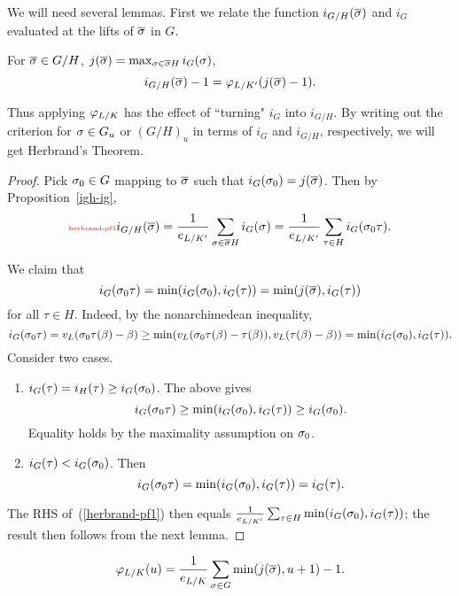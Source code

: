 We will need several lemmas. First we relate the function $i_{G/H}(\overline{\sigma})$ and $i_G$ evaluated at the lifts of $\overline{\sigma}$ in $G$. 
\begin{lem}
For $\overline{\sigma}\in G/H$, $j(\overline{\sigma})=\max_{\sigma \in \overline{\sigma}H} i_G(\sigma)$,
\[
i_{G/H}(\overline{\sigma})-1=\varphi_{L/K'} (j(\overline{\sigma})-1).
\]
\end{lem}
Thus applying $\varphi_{L/K}$ has the effect of ``turning" $i_G$ into $i_{G/H}$. By writing out the criterion for $\sigma\in G_u$ or $(G/H)_u$ in terms of $i_G$ and $i_{G/H}$, respectively, we will get Herbrand's Theorem.
\begin{proof}
Pick $\sigma_0\in G$ mapping to $\overline{\sigma}$ such that $i_G(\sigma_0)=j(\overline{\sigma})$. Then by Proposition~\ref{igh-ig},
\begin{equation}\llabel{herbrand-pf1}
i_{G/H}(\ol{\si}) 
=\rc{e_{L/K'}}\sum_{\si \in \ol{\si}H} i_G(\si)
=\rc{e_{L/K'}}\sum_{\tau\in H} i_G(\si_0\tau).
\end{equation}

We claim that
\[
i_G(\sigma_0\tau)=\min(i_G(\sigma_0),i_G(\tau))=\min(j(\overline{\sigma}), i_G(\tau))
\]
for all $\tau\in H$. Indeed, by the nonarchimedean inequality,
\[
i_G(\sigma_0\tau)=v_L(\sigma_0\tau(\beta)-\beta)\ge
\min(v_L(\sigma_0\tau(\beta)-\tau(\beta)),v_L(\tau(\beta)-\beta))= \min(i_G(\sigma_0),i_G(\tau)).
\]
Consider two cases.
\begin{enumerate}
\item
$i_G(\tau)=i_H(\tau)\ge i_G(\sigma_0)$. The above gives
\[
i_G(\sigma_0\tau)\ge \min(i_G(\sigma_0),i_G(\tau))\ge i_G(\sigma_0).
\]
Equality holds by the maximality assumption on $\sigma_0$.
\item
$i_G(\tau)<i_G(\sigma_0)$. Then \[i_G(\sigma_0\tau)=\min(i_G(\sigma_0),i_G(\tau))=i_G(\tau).\]
\end{enumerate}
The RHS of~(\ref{herbrand-pf1}) then equals $\frac{1}{e_{L/K'}}\sum_{\tau\in H} \min(i_G(\sigma_0),i_G(\tau))$; 
the result then follows from the next lemma.
\end{proof}
\begin{lem}
\[
\varphi_{L/K}(u)=\frac{1}{e_{L/K}}\sum_{\sigma\in G} \min(j(\overline{\sigma}),u+1)-1.
\]
\end{lem}

